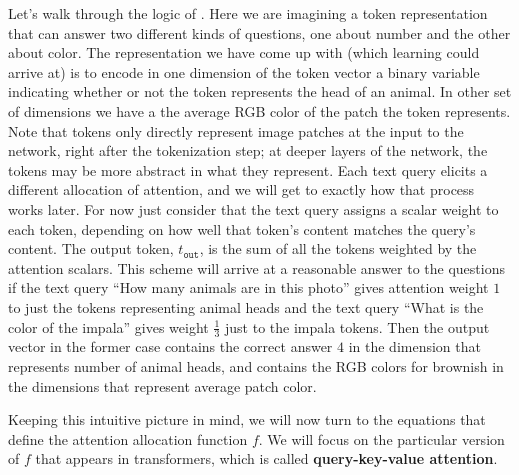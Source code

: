 Let's walk through the logic of \fig{\ref{fig:transformers:attention_layer_safari_query_cartoon}}. Here we are imagining a token representation that can answer two different kinds of questions, one about number and the other about color. The representation we have come up with (which learning could arrive at) is to encode in one dimension of the token vector a binary variable indicating whether or not the token represents the head of an animal. In other set of dimensions we have a the average RGB color of the patch the token represents. Note that tokens only directly represent image patches at the input to the network, right after the tokenization step; at deeper layers of the network, the tokens may be more abstract in what they represent. Each text query elicits a different allocation of attention, and we will get to exactly how that process works later. For now just consider that the text query assigns a scalar weight to each token, depending on how well that token's content matches the query's content. The output token, $t_{\texttt{out}}$, is the sum of all the tokens weighted by the attention scalars. This scheme will arrive at a reasonable answer to the questions if the text query ``How many animals are in this photo'' gives attention weight $1$ to just the tokens representing animal heads and the text query ``What is the color of the impala'' gives weight $\frac{1}{3}$ just to the impala tokens. Then the output vector in the former case contains the correct answer $4$ in the dimension that represents number of animal heads, and contains the RGB colors for brownish in the dimensions that represent average patch color.


Keeping this intuitive picture in mind, we will now turn to the equations that define the attention allocation function $f$. We will focus on the particular version of $f$ that appears in transformers, which is called \textbf{query-key-value attention}.

